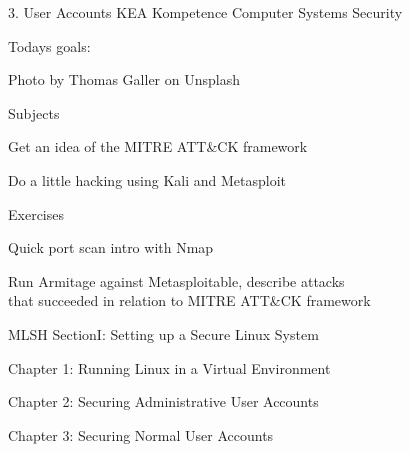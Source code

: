 \documentclass[Screen16to9,17pt]{foils}
\begin{document}
\mytitlepage
{3. User Accounts}
{KEA Kompetence Computer Systems Security \the\year}




Todays goals:
\begin{list2}
\item
\end{list2}

  Photo by Thomas Galler on Unsplash


\begin{list1}
\item Subjects
\begin{list2}
\item Get an idea of the MITRE ATT\&CK framework
\item Do a little hacking using Kali and Metasploit
\end{list2}
\item Exercises
\begin{list2}
\item Quick port scan intro with Nmap
\item Run Armitage against Metasploitable, describe attacks\\
that succeeded in relation to MITRE ATT\&CK framework
\end{list2}
\end{list1}




MLSH SectionI: Setting up a Secure Linux System
\begin{list1}
\item Chapter 1: Running Linux in a Virtual Environment
\item Chapter 2: Securing Administrative User Accounts
\item Chapter 3: Securing Normal User Accounts
\end{list1}


\slidenext
\end{document}
